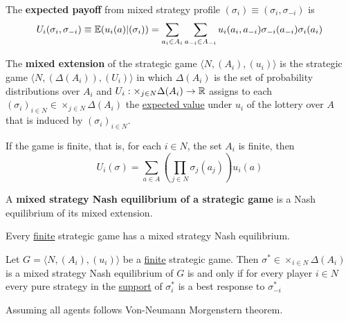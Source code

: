 \documentclass[11pt]{article}
\begin{document}
		\begin{proposition}
			The \textbf{expected payoff} from mixed strategy profile $(\sigma_i) \equiv (\sigma_i, \sigma_{-i})$ is
			\[
				U_i(\sigma_i, \sigma_{-i}) \equiv \mathbb{E}({u_i(a)|(\sigma_i)}) = \sum_{a_i \in A_i} \sum_{a_{-i} \in A_{-i}} u_i(a_i, a_{-i}) \sigma_{-i}(a_{-i}) \sigma_i(a_i)
			\]
		\end{proposition}
		
		\begin{definition}[32.1]
			The \textbf{mixed extension} of the strategic game $\langle N, (A_i), (u_i) \rangle$ is the strategic game $\langle N, (\Delta(A_i)), (U_i) \rangle$ in which $\Delta(A_i)$ is the set of probability distributions over $A_i$ and $U_i: \times_{j \in N} \Delta(A_i) \to \mathbb{R}$ assigns to each $(\sigma_i)_{i \in N} \in \times_{j \in N} \Delta(A_i)$ the \ul{expected value} under $u_i$ of the lottery over $A$ that is induced by $(\sigma_i)_{i \in N}$.
		\end{definition}
		
		\begin{remark}
			If the game is finite, that is, for each $i \in N$, the set $A_i$ is finite, then
			\[
				U_i(\sigma) = \sum_{a \in A} (\prod_{j \in N} \sigma_j(a_j)) u_i(a)
			\]
		\end{remark}
		
		\begin{definition}[32.3]
			A \textbf{mixed strategy Nash equilibrium of a strategic game} is a Nash equilibrium of its mixed extension.
		\end{definition}
		
		\begin{proposition}[33.1]
			Every \ul{finite} strategic game has a mixed strategy Nash equilibrium.
		\end{proposition}
		
		\begin{lemma}[33.2]
			Let $G = \langle N, (A_i), (u_i) \rangle$ be a \ul{finite} strategic game. Then $\sigma^* \in \times_{i \in N}\Delta(A_i)$ is a mixed strategy Nash equilibrium of $G$ is and only if for every player $i \in N$ every pure strategy in the \ul{support} of $\sigma_i^*$ is a best response to $\sigma_{-i}^*$
		\end{lemma}
		
		\begin{assumption}[lec.5]
			Assuming all agents follows Von-Neumann Morgenstern theorem. 
		\end{assumption}
		
\end{document}
